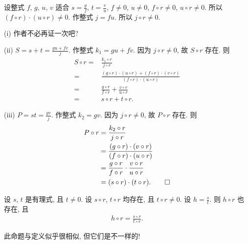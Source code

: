\begin{pf}
    设整式 $f$, $g$, $u$, $v$ 适合 $s = \frac{g}{f}$, $t = \frac{v}{u}$, $f \neq 0$, $u \neq 0$, $f \circ r \neq 0$, $u \circ r \neq 0$. 所以 $(f \circ r) \cdot (u \circ r) \neq 0$. 作整式 $j = fu$. 所以 $j \circ r \neq 0$.

    (i) 作者不必再证一次吧?

    (ii) $S = s + t = \frac{gu + fv}{j}$. 作整式 $k_1 = gu + fv$. 因为 $j \circ r \neq 0$, 故 $S \circ r$ 存在. 则
    \begin{align*}
        S \circ r
        = {} & \frac{k_1 \circ r}{j \circ r}                                                                       \\
        = {} & \frac{(g \circ r) \cdot (u \circ r) + (f \circ r) \cdot (v \circ r)}{(f \circ r) \cdot (u \circ r)} \\
        = {} & \frac{g \circ r}{f \circ r} + \frac{v \circ r}{u \circ r}                                           \\
        = {} & s \circ r + t \circ r.
    \end{align*}

    (iii) $P = st = \frac{gv}{j}$. 作整式 $k_2 = gv$. 因为 $j \circ r \neq 0$, 故 $P \circ r$ 存在. 则
    \begin{align*}
        P \circ r
        = {} & \frac{k_2 \circ r}{j \circ r}                                       \\
        = {} & \frac{(g \circ r) \cdot (v \circ r)}{(f \circ r) \cdot (u \circ r)} \\
        = {} & \frac{g \circ r}{f \circ r} \cdot \frac{v \circ r}{u \circ r}       \\
        = {} & (s \circ r) \cdot (t \circ r). \qedhere
    \end{align*}
\end{pf}

\begin{proposition}
    设 $s$, $t$ 是有理式, 且 $t \neq 0$. 设 $s \circ r$, $t \circ r$ 均存在, 且 $t \circ r \neq 0$. 设 $h = \frac{s}{t}$. 则 $h \circ r$ 也存在, 且
    \begin{align*}
        h \circ r = \frac{s \circ r}{t \circ r}.
    \end{align*}
\end{proposition}

\begin{remark}
    此命题与定义似乎很相似, 但它们是不一样的!
\end{remark}

